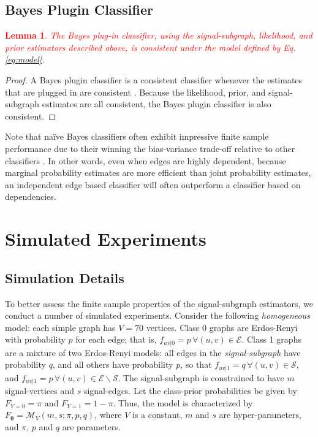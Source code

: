 \documentclass[10pt,journal,cspaper,compsoc]{IEEEtran}
\providecommand{\tr}[1]{\textcolor{red}{#1}}
\providecommand{\ve}[1]{\boldsymbol{#1}}
\newcommand{\bth}{\ve{\theta}}
\providecommand{\mc}[1]{\mathcal{#1}}
\newtheorem{Lem}{Lemma}[section]
\begin{document}
\subsection{Bayes Plugin Classifier}

\tr{\begin{Lem}
	The Bayes plug-in classifier, using the signal-subgraph, likelihood, and prior estimators described above, is consistent under the model defined by Eq. \eqref{eq:model}.
\end{Lem}
}
 
\begin{proof}
A Bayes plugin classifier is a consistent classifier whenever the estimates that are plugged in are consistent \cite{Bickel2000}.  Because the likelihood, prior, and signal-subgraph estimates are all consistent, the Bayes plugin classifier is also consistent.  
\end{proof}

Note that na\"ive Bayes classifiers often exhibit impressive finite sample performance due to their winning the bias-variance trade-off relative to other classifiers \cite{Hand2001}.  In other words, even when edges are highly dependent, because marginal probability estimates are more efficient than joint probability estimates, an independent edge based classifier will often outperform a classifier based on dependencies.






\section{Simulated Experiments} %
\label{sub:subsection_name}

\subsection{Simulation Details} %
\label{sub:simulation_details}

To better assess the finite sample properties of the signal-subgraph estimators, we conduct a number of simulated experiments.  Consider the following \emph{homogeneous} model: each simple graph has $V=70$ vertices.  Class 0 graphs are Erdos-Renyi with probability $p$ for each edge; that is, $f_{uv|0}=p \, \forall (u,v) \in \mc{E}$.  Class 1 graphs are a mixture of two Erdos-Renyi models: all edges in the \emph{signal-subgraph} have probability $q$, and all others have probability $p$, so that $f_{uv|1}=q \, \forall (u,v) \in \mc{S}$, and $f_{uv|1}=p \, \forall (u,v) \in \mc{E} \backslash \mc{S}$.  The signal-subgraph is constrained to have $m$ signal-vertices and $s$ signal-edges.  Let the class-prior probabilities be given by $F_{Y=0}=\pi$ and $F_{Y=1}=1-\pi$. Thus, the model is characterized by $F_{\bth}=\mc{M}_V(m,s; \pi,p,q)$, where $V$ is a constant, $m$ and $s$ are hyper-parameters, and $\pi$, $p$ and $q$ are parameters.  
\end{document}
